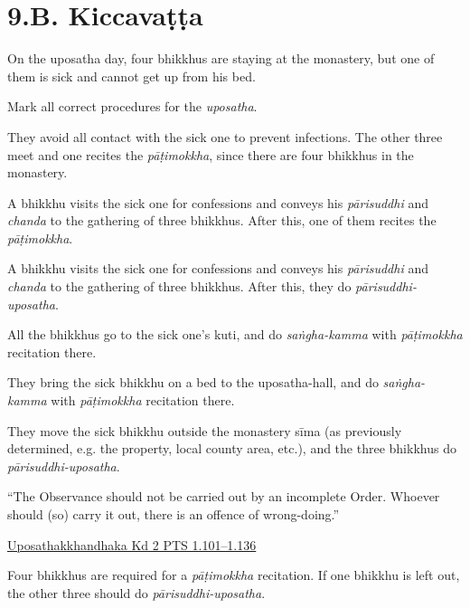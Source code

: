 \chapter{9.B. Kiccavaṭṭa}
\renewcommand*{\theChapterTitle}{9.B. Kiccavaṭṭa}

\begin{exam}{\autoExamName}

\begin{problem}

  On the uposatha day, four bhikkhus are staying at the monastery, but one of
  them is sick and cannot get up from his bed.

  Mark all correct procedures for the \emph{uposatha}.

  \bigskip

  \begin{manswers}{1}
    \bChoices

     They avoid all contact with the sick one to prevent infections. The
    other three meet and one recites the \emph{pāṭimokkha}, since there are four
    bhikkhus in the monastery.\eAns

     A bhikkhu visits the sick one for confessions and conveys his
    \emph{pārisuddhi} and \emph{chanda} to the gathering of three bhikkhus.
    After this, one of them recites the \emph{pāṭimokkha}.\eAns

     A bhikkhu visits the sick one for confessions and conveys his
    \emph{pārisuddhi} and \emph{chanda} to the gathering of three bhikkhus.
    After this, they do \emph{pārisuddhi-uposatha}.\eAns

     All the bhikkhus go to the sick one's kuti, and do \emph{saṅgha-kamma}
    with \emph{pāṭimokkha} recitation there.\eAns

     They bring the sick bhikkhu on a bed to the uposatha-hall, and do
    \emph{saṅgha-kamma} with \emph{pāṭimokkha} recitation there.\eAns

     They move the sick bhikkhu outside the monastery sīma (as previously
    determined, e.g. the property, local county area, etc.), and the three
    bhikkhus do \emph{pārisuddhi-uposatha}.\eAns

    \eChoices
  \end{manswers}

  \begin{solution}
    ``The Observance should not be carried out by an incomplete Order. Whoever
    should (so) carry it out, there is an offence of wrong-doing.''

    \href{https://suttacentral.net/pli-tv-kd2/en/horner-brahmali}{Uposathakkhandhaka Kd 2 PTS 1.101–1.136}

    Four bhikkhus are required for a \emph{pāṭimokkha} recitation. If one
    bhikkhu is left out, the other three should do \emph{pārisuddhi-uposatha}.
  \end{solution}

\end{problem}

\end{exam}

